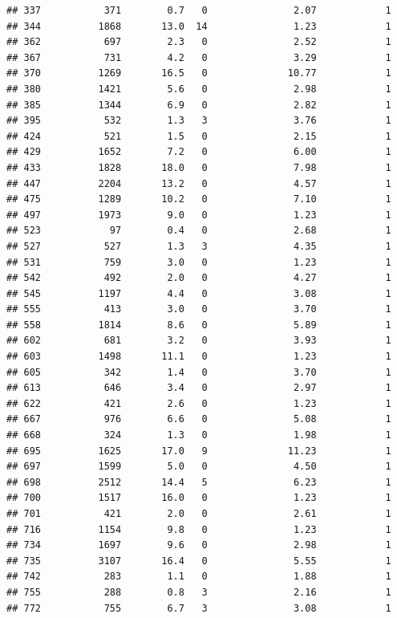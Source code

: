 \documentclass[
]{article}
\begin{document}
\begin{verbatim}
## 337           371        0.7   0               2.07            1
## 344          1868       13.0  14               1.23            1
## 362           697        2.3   0               2.52            1
## 367           731        4.2   0               3.29            1
## 370          1269       16.5   0              10.77            1
## 380          1421        5.6   0               2.98            1
## 385          1344        6.9   0               2.82            1
## 395           532        1.3   3               3.76            1
## 424           521        1.5   0               2.15            1
## 429          1652        7.2   0               6.00            1
## 433          1828       18.0   0               7.98            1
## 447          2204       13.2   0               4.57            1
## 475          1289       10.2   0               7.10            1
## 497          1973        9.0   0               1.23            1
## 523            97        0.4   0               2.68            1
## 527           527        1.3   3               4.35            1
## 531           759        3.0   0               1.23            1
## 542           492        2.0   0               4.27            1
## 545          1197        4.4   0               3.08            1
## 555           413        3.0   0               3.70            1
## 558          1814        8.6   0               5.89            1
## 602           681        3.2   0               3.93            1
## 603          1498       11.1   0               1.23            1
## 605           342        1.4   0               3.70            1
## 613           646        3.4   0               2.97            1
## 622           421        2.6   0               1.23            1
## 667           976        6.6   0               5.08            1
## 668           324        1.3   0               1.98            1
## 695          1625       17.0   9              11.23            1
## 697          1599        5.0   0               4.50            1
## 698          2512       14.4   5               6.23            1
## 700          1517       16.0   0               1.23            1
## 701           421        2.0   0               2.61            1
## 716          1154        9.8   0               1.23            1
## 734          1697        9.6   0               2.98            1
## 735          3107       16.4   0               5.55            1
## 742           283        1.1   0               1.88            1
## 755           288        0.8   3               2.16            1
## 772           755        6.7   3               3.08            1

\end{verbatim}
\end{document}

